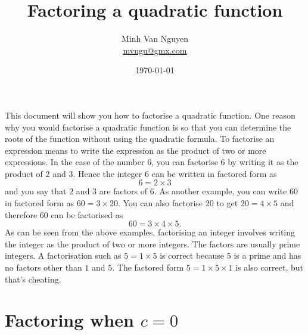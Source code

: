 \documentclass[a4paper,oneside,12pt]{article}
\begin{document}
\title{\Large\bf Factoring a quadratic function}
\author{%
  Minh Van Nguyen \\
  \url{mvngu@gmx.com}
}
\date{\today}
\maketitle

\noindent
This document will show you how to factorise a quadratic function.
One reason why you would factorise a quadratic function is so that you
can determine the roots of the function without using the quadratic
formula.  To factorise an expression means to write the expression as
the product of two or more expressions.  In the case of the number
$6$, you can factorise $6$ by writing it as the product of $2$ and
$3$.  Hence the integer $6$ can be written in factored form as
\[
6
=
2 \times 3
\]
and you say that $2$ and $3$ are factors of $6$.  As another example,
you can write $60$ in factored form as $60 = 3 \times 20$.  You can
also factorise $20$ to get $20 = 4 \times 5$ and therefore $60$ can be
factorised as
\[
60
=
3 \times 4 \times 5.
\]
As can be seen from the above examples, factorising an integer
involves writing the integer as the product of two or more integers.
The factors are usually prime integers.  A factorisation such as
$5 = 1 \times 5$ is correct because $5$ is a prime and has no factors
other than $1$ and $5$.  The factored form $5 = 1 \times 5 \times 1$
is also correct, but that's cheating.



\section{Factoring when $c = 0$}
\end{document}
